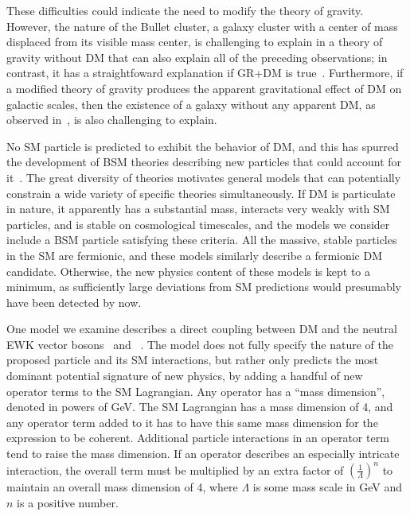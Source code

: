 \documentclass[oneside, letterpaper, 12pt, oldfontcommands]{memoir}
\begin{document}
These difficulties could indicate the need to modify the theory of gravity.
However, the nature of the Bullet cluster, a galaxy cluster with a center of mass displaced from its visible mass center, is challenging to explain in a theory of gravity without DM that can also explain all of
the preceding observations; in contrast, it has a straightfoward explanation if GR+DM is true~\cite{ref:508162}. Furthermore, if a modified theory of gravity
produces the apparent gravitational effect of DM on galactic scales, then the existence of a galaxy without any apparent DM, as observed in~\cite{ref:nature25767}, is
also challenging to explain.

No SM particle is predicted to exhibit the behavior of DM, and this has spurred the development
of BSM theories describing new particles that could account for it~\cite{ref:s41550-017-0059, ref:j.physrep.2004.08.031, ref:annurev.nucl.54.070103.181244, ref:S1062798717000783}.
The great diversity of theories motivates general models that can potentially constrain a wide variety of specific theories simultaneously.
If DM is particulate in nature, it apparently has a substantial mass, interacts very weakly with SM particles, and is stable on cosmological timescales,
and the models we consider include a BSM particle satisfying these criteria.
All the massive, stable particles in the SM are fermionic, and these models similarly describe a fermionic DM candidate. Otherwise, the new physics
content of these models is kept to a minimum, as sufficiently large deviations from SM predictions would presumably have been detected by now.

One model we examine describes a direct coupling between DM and the neutral EWK vector bosons \PZ\ and \Pgamma~\cite{ref:PhysRevD.89.056011}. The model does not fully specify
the nature of the proposed particle and its SM interactions, but rather only predicts the most dominant potential signature of new physics,
by adding a handful of new operator terms to the SM Lagrangian. Any operator has a ``mass dimension'', denoted in powers of GeV. The SM Lagrangian has
a mass dimension of 4, and any operator term added to it has to have this same mass dimension for the expression to be coherent.
Additional particle interactions in an operator term tend to raise the mass dimension. If an operator describes an especially intricate interaction,
the overall term must be multiplied by an extra factor of $(\frac{1}{\Lambda})^{n}$ to maintain an overall mass dimension of 4, where $\Lambda$ is some mass
scale in GeV and $n$ is a positive number.
\end{document}
